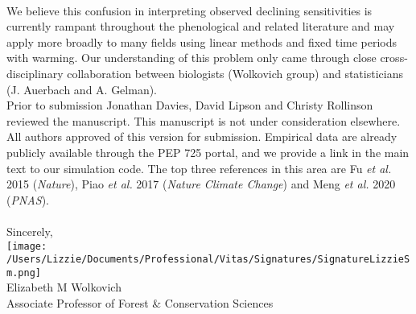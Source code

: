 \documentclass[11pt,a4paper]{article}
\begin{document}
\vspace{1.5ex}\\
We believe this confusion in interpreting observed declining sensitivities is currently rampant throughout the phenological \citep[e.g.,][]{fu2015,Samplonius:2018aa,vitasse2018,meng2020} and related literature \citep[e.g.,][]{piao2017} and may apply more broadly to many fields using linear methods and fixed time periods with warming. Our understanding of this problem only came through close cross-disciplinary collaboration between biologists (Wolkovich group) and statisticians (J. Auerbach and A. Gelman). 
\vspace{1.5ex}\\
Prior to submission Jonathan Davies, David Lipson and Christy Rollinson reviewed the manuscript. This manuscript is not under consideration elsewhere. All authors approved of this version for submission. Empirical data are already publicly available through the PEP 725 portal, and we provide a link in the main text to our simulation code. The top three references in this area are Fu \emph{et al.} 2015 (\emph{Nature}), Piao \emph{et al.} 2017 (\emph{Nature Climate Change}) and Meng \emph{et al.} 2020 (\emph{PNAS}).\\
\vspace{1.5ex}\\
Sincerely,\\

\texttt{[image: /Users/Lizzie/Documents/Professional/Vitas/Signatures/SignatureLizzieSm.png]} \\

\noindent Elizabeth M Wolkovich\\
Associate Professor of Forest \& Conservation Sciences\\ 


\end{document}

